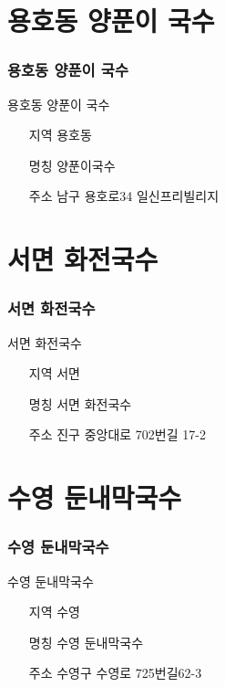 \documentclass[aspectratio=1610,17pt,xcolor=pdftex,dvipsnames,table,handout]{beamer}
\begin{document}
		\section{ 용호동 양푼이 국수 }
		\begin{frame} [t,plain]
		\frametitle{ 용호동 양푼이 국수 }
			\begin{block} { 용호동 양푼이 국수 }
			\setlength{\leftmargini}{4em}			
			\begin{itemize}
				\item [지역] 용호동	
				\item [명칭] 양푼이국수	
				\item [주소] 남구 용호로34 일신프리빌리지
			\end{itemize}
			\end{block}						
		\end{frame}						

		\section{ 서면 화전국수	}
		\begin{frame} [t,plain]
		\frametitle{ 서면 화전국수	}
			\begin{block} { 서면 화전국수	}
			\setlength{\leftmargini}{4em}			
			\begin{itemize}
				\item [지역] 서면	
				\item [명칭] 서면 화전국수	
				\item [주소] 진구 중앙대로 702번길 17-2
			\end{itemize}
			\end{block}						
		\end{frame}						


		\section{ 수영 둔내막국수	}
		\begin{frame} [t,plain]
		\frametitle{ 수영 둔내막국수	}
			\begin{block} { 수영 둔내막국수	}
			\setlength{\leftmargini}{4em}			
			\begin{itemize}
				\item [지역] 수영	
				\item [명칭] 수영 둔내막국수	
				\item [주소] 수영구 수영로 725번길62-3
			\end{itemize}
			\end{block}						
		\end{frame}						
\end{document}
